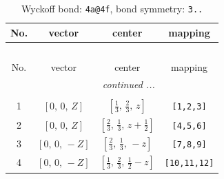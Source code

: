 \documentclass[fleqn,8pt]{jsarticle}
\begin{document}
\renewcommand{\arraystretch}{1.2}
\begin{longtable}{cccc}
\caption{Wyckoff bond: {\tt 4a@4f}, bond symmetry: {\tt 3..}}
 \\
 \hline \hline
No. & vector & center & mapping \\ \hline \endfirsthead

\multicolumn{3}{l}{\tablename\ \thetable{}} \\
 \hline \hline
No. & vector & center & mapping \\ \hline \endhead

 \hline \hline
\multicolumn{3}{r}{\footnotesize\it continued ...} \\ \endfoot

 \hline \hline
\multicolumn{3}{r}{} \\ \endlastfoot

1 & $\left[ 0,\, 0,\, Z \right]$ & $\left[ \frac{1}{3},\, \frac{2}{3},\, z \right]$ & {\tt [1,2,3]} \\ \hline
2 & $\left[ 0,\, 0,\, Z \right]$ & $\left[ \frac{2}{3},\, \frac{1}{3},\, z + \frac{1}{2} \right]$ & {\tt [4,5,6]} \\ \hline
3 & $\left[ 0,\, 0,\, - Z \right]$ & $\left[ \frac{2}{3},\, \frac{1}{3},\, - z \right]$ & {\tt [7,8,9]} \\ \hline
4 & $\left[ 0,\, 0,\, - Z \right]$ & $\left[ \frac{1}{3},\, \frac{2}{3},\, \frac{1}{2} - z \right]$ & {\tt [10,11,12]} \\
\end{longtable}
\renewcommand{\arraystretch}{1.2}
\end{document}
